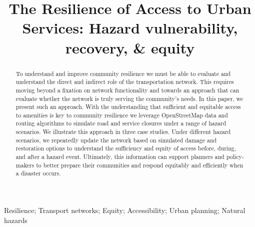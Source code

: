 \documentclass[review,3p,times,onecolumn,sort&compress,12pt]{elsarticle}
\begin{document}
\begin{frontmatter}

\title{The Resilience of Access to Urban Services: Hazard vulnerability, recovery, \& equity}






\begin{abstract}
To understand and improve community resilience we must be able to evaluate and understand the direct and indirect role of the transportation network.
This requires moving beyond a fixation on network functionality and towards an approach that can evaluate whether the network is truly serving the community’s needs.
In this paper, we present such an approach.
With the understanding that sufficient and equitable access to amenities is key to community resilience we leverage OpenStreetMap data and routing algorithms to simulate road and service closures under a range of hazard scenarios.
We illustrate this approach in three case studies.
Under different hazard scenarios, we repeatedly update the network based on simulated damage and restoration options to understand the sufficiency and equity of access before, during, and after a hazard event.
Ultimately, this information can support planners and policy-makers to better prepare their communities and respond equitably and efficiently when a disaster occurs.
\end{abstract}

\begin{keyword}
Resilience; Transport networks; Equity; Accessibility; Urban planning; Natural hazards
\end{keyword}

\end{frontmatter}
\end{document}
